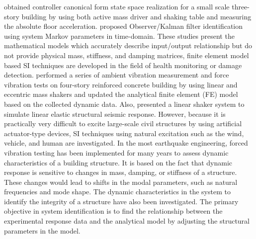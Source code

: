 \citet{dyke1994experimental} obtained controller canonical form state space realization for a small scale three-story building by using both active mass driver and shaking table and measuring the absolute floor acceleration. \citet{juang1994applied} proposed Observer/Kalman filter identification using system Markov parameters in time-domain. These studies present the mathematical models which accurately describe input/output relationship but do not provide physical mass, stiffness, and damping matrices, finite element model based SI techniques are developed in the field of health monitoring or damage detection\citep{van2003sensors}. \citet{yu2005forced} performed a series of ambient vibration measurement and force vibration tests on four-story reinforced concrete building by using linear and eccentric mass shakers and updated the analytical finite element (FE) model based on the collected dynamic data. Also, \citet{yu2005forced} presented a linear shaker system to simulate linear elastic structural seismic response. However, because it is practically very difficult to excite large-scale civil structures by using artificial actuator-type devices, SI techniques using natural excitation such as the wind, vehicle, and human are investigated.
In the most earthquake engineering, forced vibration testing has been implemented for many years to assess dynamic characteristics of a building structure. It is based on the fact that dynamic response is sensitive to changes in mass, damping, or stiffness of a structure. These changes would lead to shifts in the modal parameters, such as natural frequencies and mode shape. The dynamic characteristics in the system to identify the integrity of a structure have also been investigated\citep{dyke1994experimental}. The primary objective in system identification is to find the relationship between the experimental response data and the analytical model by adjusting the structural parameters in the model.


